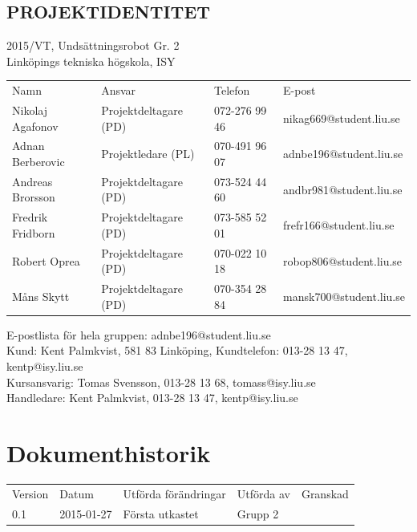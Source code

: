 \documentclass[11pt]{article}
\begin{document}
\pagebreak
\begin{center}

\section*{PROJEKTIDENTITET}
2015/VT, Undsättningsrobot Gr. 2
\\
Linköpings tekniska högskola, ISY
\\[0.5in]
\begin{table}[h]
\begin{tabular}{llll}
Namn & Ansvar & Telefon & E-post \\[0.1in]
Nikolaj Agafonov & Projektdeltagare (PD) & 072-276 99 46 & nikag669@student.liu.se \\
Adnan Berberovic & Projektledare (PL) & 070-491 96 07 & adnbe196@student.liu.se \\
Andreas Brorsson & Projektdeltagare (PD) & 073-524 44 60 & andbr981@student.liu.se \\
Fredrik Fridborn & Projektdeltagare (PD) & 073-585 52 01 & frefr166@student.liu.se \\
Robert Oprea & Projektdeltagare (PD) & 070-022 10 18 & robop806@student.liu.se \\
Måns Skytt & Projektdeltagare (PD) & 070-354 28 84 & mansk700@student.liu.se
\end{tabular}
\end{table}

E-postlista för hela gruppen: adnbe196@student.liu.se
\\[1in]
Kund: Kent Palmkvist, 581 83 Linköping,
Kundtelefon: 013-28 13 47, kentp@isy.liu.se
\\[1in]
Kursansvarig: Tomas Svensson, 013-28 13 68, tomass@isy.liu.se
\\
Handledare: Kent Palmkvist, 013-28 13 47, kentp@isy.liu.se
\end{center}
\pagebreak

\tableofcontents

\pagebreak

\section*{Dokumenthistorik}
\begin{table}[h]
\begin{tabular}{lllll}

Version & Datum & Utförda förändringar & Utförda av & Granskad \\[0.1in]
0.1 & 2015-01-27 & Första utkastet & Grupp 2 &

\end{tabular}
\end{table}
\end{document}
